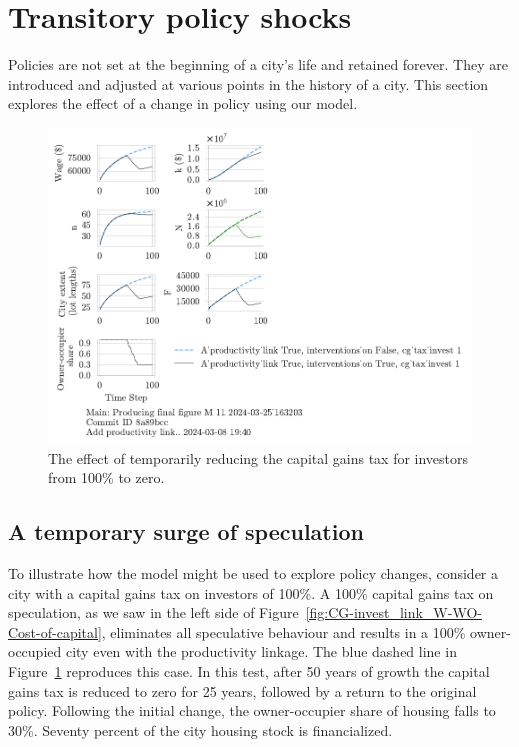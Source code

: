 \section{Transitory policy shocks}

Policies are not set at the beginning of a city's life and retained forever. %
They are introduced and adjusted at various points in the history of a city. This section explores the effect of a change in policy using our model.

\begin{figure}[h!tb] 
    \centering
    \includegraphics[scale=1.5, trim={0 1.4cm 7cm 0},clip]{fig/interventions_on-cg_tax_invest-163203.pdf}  %
    \caption[Temporarily reducing the capital gains tax for investors from 100\%]{The effect of temporarily reducing the capital gains tax for investors from 100\% to zero.}
    \label{fig:cgtax_setback}
\end{figure}


\subsection{A temporary surge of speculation}
To illustrate how the model might be used to explore policy changes, consider a city with a capital gains tax on investors of 100\%. A 100\% capital gains tax on speculation, as we saw in the left side of Figure~\ref{fig:CG-invest_link_W-WO-Cost-of-capital}, eliminates all speculative behaviour and results in a 100\% owner-occupied city even with the productivity linkage. The blue dashed line in Figure~\ref{fig:cgtax_setback} reproduces this case. In this test, after 50 years of growth the capital gains tax is reduced to zero for 25 years, followed by a return to the original policy. Following the initial change,  the owner-occupier share of housing falls to 30\%. Seventy percent of the city housing stock is financialized.

